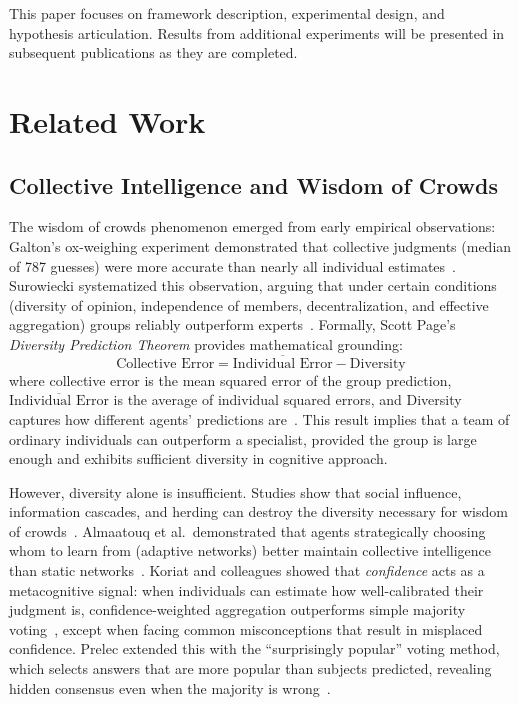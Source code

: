 \documentclass[format=acmsmall, review=false]{acmart}
\begin{document}
This paper focuses on framework description, experimental design, and hypothesis articulation.
Results from additional experiments will be presented in subsequent publications as they are completed.

\section{Related Work}

\subsection{Collective Intelligence and Wisdom of Crowds}

The wisdom of crowds phenomenon emerged from early empirical observations:
Galton's ox-weighing experiment demonstrated that collective judgments (median of 787 guesses) were more accurate than nearly all individual estimates~\cite{galton1907}.
Surowiecki systematized this observation, arguing that under certain conditions (diversity of opinion, independence of members, decentralization, and effective aggregation) groups reliably outperform experts~\cite{surowiecki2004}.
Formally, Scott Page's \emph{Diversity Prediction Theorem} provides mathematical grounding:
\begin{equation}
  \text{Collective Error} = \overline{\text{Individual Error}} - \text{Diversity}
\end{equation}
where collective error is the mean squared error of the group prediction, \(\overline{\text{Individual Error}}\) is the average of individual squared errors, and Diversity captures how different agents' predictions are~\cite{page2007}.
This result implies that a team of ordinary individuals can outperform a specialist, provided the group is large enough and exhibits sufficient diversity in cognitive approach.

However, diversity alone is insufficient.
Studies show that social influence, information cascades, and herding can destroy the diversity necessary for wisdom of crowds~\cite{surowiecki2004,almaatouq2020}.
Almaatouq et al.\ demonstrated that agents strategically choosing whom to learn from (adaptive networks) better maintain collective intelligence than static networks~\cite{almaatouq2020}.
Koriat and colleagues showed that \emph{confidence} acts as a metacognitive signal:
when individuals can estimate how well-calibrated their judgment is, confidence-weighted aggregation outperforms simple majority voting~\cite{koriat2011}, except when facing common misconceptions that result in misplaced confidence.
Prelec extended this with the ``surprisingly popular'' voting method, which selects answers that are more popular than subjects predicted, revealing hidden consensus even when the majority is wrong~\cite{prelec2017}.
\end{document}
